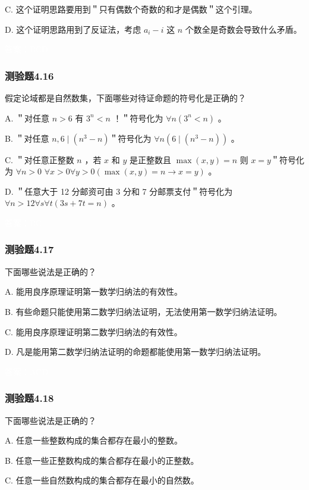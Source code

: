 \documentclass[UTF8, heading=true]{ctexart}
\begin{document}
C. 
这个证明思路要用到＂只有偶数个奇数的和才是偶数＂这个引理。

D.  
这个证明思路用到了反证法，考虑 $a_i-i$ 这 $n$ 个数全是奇数会导致什么矛盾。

\textcolor{white}{答案：BCD}

\subsubsection{测验题4.16}

假定论域都是自然数集，下面哪些对待证命题的符号化是正确的？

A. ＂对任意 $n>6$ 有 $3^n<n$ ！＂符号化为 $\forall n\left(3^n<n\right)$ 。

B. ＂对任意 $n, 6 \mid\left(n^3-n\right)$＂符号化为 $\forall n\left(6 \mid\left(n^3-n\right)\right)$ 。

C. ＂对任意正整数 $n$ ，若 $x$ 和 $y$ 是正整数且 $\max (x, y)=n$ 则 $x=y$＂符号化为 $\forall n>0$
$\forall x>0 \forall y>0(\max (x, y)=n \rightarrow x=y)$ 。

D.  ＂任意大于 12 分邮资可由 3 分和 7 分邮票支付＂符号化为 $\forall n>12 \forall s \forall t(3 s+7 t=n)$ 。

\textcolor{white}{答案：BC}


\subsubsection{测验题4.17}

下面哪些说法是正确的？

A. 能用良序原理证明第一数学归纳法的有效性。

B. 有些命题只能使用第二数学归纳法证明，无法使用第一数学归纳法证明。

C. 能用良序原理证明第二数学归纳法的有效性。

D.  凡是能用第二数学归纳法证明的命题都能使用第一数学归纳法证明。

\textcolor{white}{答案：ACD}

\subsubsection{测验题4.18}

下面哪些说法是正确的？

A. 
任意一些整数构成的集合都存在最小的整数。

B. 
任意一些正整数构成的集合都存在最小的正整数。

C. 
任意一些自然数构成的集合都存在最小的自然数。
\end{document}
